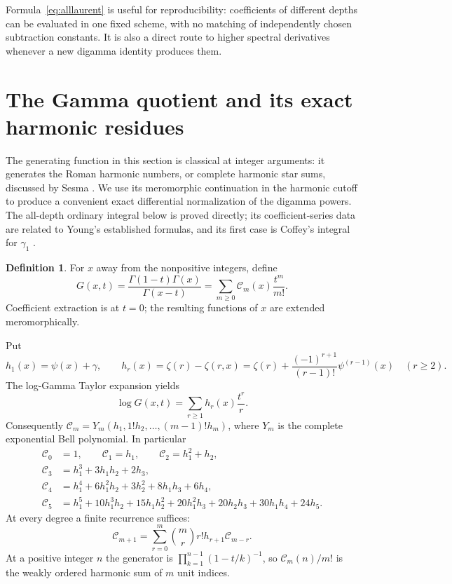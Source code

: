 \documentclass[11pt,a4paper]{article}
\numberwithin{equation}{section}
\theoremstyle{definition}
\newtheorem{definition}[theorem]{Definition}
\newcommand{\CM}{\mathcal C}
\begin{document}
Formula~\eqref{eq:alllaurent} is useful for reproducibility: coefficients
of different depths can be evaluated in one fixed scheme, with no
matching of independently chosen subtraction constants. It is also a
direct route to higher spectral derivatives whenever a new digamma
identity produces them.


\section{The Gamma quotient and its exact harmonic residues}
\label{sec:gamma}

The generating function in this section is classical at integer
arguments: it generates the Roman harmonic numbers, or complete
harmonic star sums, discussed by Sesma \cite[Eq.~(49)]{Sesma}.
We use its meromorphic continuation in the harmonic cutoff to produce
a convenient exact differential normalization of the digamma powers.
The all-depth ordinary integral below is proved directly; its
coefficient-series data are related to Young's established formulas,
and its first case is Coffey's integral for $\gamma_1$
\cite[Eq.~(1.19)]{Coffey}.

\begin{definition}\label{def:Cm}
For $x$ away from the nonpositive integers, define
\begin{equation}\label{eq:GammaGenerator}
 G(x,t)=\frac{\Gamma(1-t)\Gamma(x)}{\Gamma(x-t)}
       =\sum_{m\ge0}\CM_m(x)\frac{t^m}{m!}.
\end{equation}
Coefficient extraction is at $t=0$; the resulting functions of $x$
are extended meromorphically.
\end{definition}

Put
\begin{equation}\label{eq:hr}
 h_1(x)=\psi(x)+\gamma,\qquad
 h_r(x)=\zeta(r)-\zeta(r,x)
       =\zeta(r)+\frac{(-1)^{r+1}}{(r-1)!}\psi^{(r-1)}(x)
       \quad(r\ge2).
\end{equation}
The log-Gamma Taylor expansion yields
\begin{equation}\label{eq:logG}
 \log G(x,t)=\sum_{r\ge1}h_r(x)\frac{t^r}{r}.
\end{equation}
Consequently $\CM_m=Y_m(h_1,1!h_2,\ldots,(m-1)!h_m)$,
where $Y_m$ is the complete exponential Bell polynomial. In particular
\begin{align}
 \CM_0&=1,\qquad \CM_1=h_1,\qquad
 \CM_2=h_1^2+h_2,\\
 \CM_3&=h_1^3+3h_1h_2+2h_3,\\
 \CM_4&=h_1^4+6h_1^2h_2+3h_2^2+8h_1h_3+6h_4,\\
 \CM_5&=h_1^5+10h_1^3h_2+15h_1h_2^2+20h_1^2h_3
                +20h_2h_3+30h_1h_4+24h_5.
 \label{eq:Cfirst}
\end{align}
At every degree a finite recurrence suffices:
\begin{equation}\label{eq:Crecurrence}
 \CM_{m+1}=
 \sum_{r=0}^m\binom mr r!h_{r+1}\CM_{m-r}.
\end{equation}
At a positive integer $n$ the generator is
$\prod_{k=1}^{n-1}(1-t/k)^{-1}$, so $\CM_m(n)/m!$ is the
weakly ordered harmonic sum of $m$ unit indices.
\end{document}
